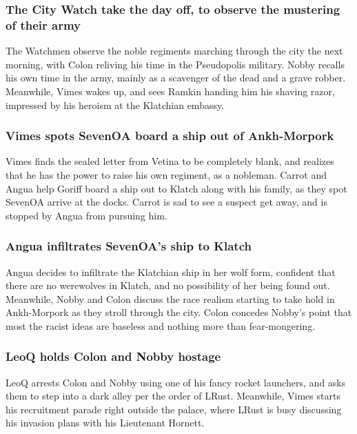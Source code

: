 \subsubsection{The City Watch take the day off, to observe the mustering of their army}
The Watchmen observe the noble regiments marching through the city the next morning, with
\Gls{Colon} reliving his time in the Pseudopolis military. \Gls{Nobby} recalls his own time in the
army, mainly as a scavenger of the dead and a grave robber. Meanwhile, \Gls{Vimes} wakes up, and
sees \Gls{Ramkin} handing him his shaving razor, impressed by his heroism at the Klatchian embassy.

\subsubsection{\Gls{Vimes} spots \Gls{SevenOA} board a ship out of Ankh-Morpork}
\Gls{Vimes} finds the sealed letter from \Gls{Vetina} to be completely blank, and realizes that he
has the power to raise his own regiment, as a nobleman. \Gls{Carrot} and \Gls{Angua} help
\Gls{Goriff} board a ship out to Klatch along with his family, as they spot \Gls{SevenOA} arrive at
the docks. \Gls{Carrot} is sad to see a suspect get away, and is stopped by \Gls{Angua} from
pursuing him.

\subsubsection{\Gls{Angua} infiltrates \Gls{SevenOA}'s ship to Klatch}
\Gls{Angua} decides to infiltrate the Klatchian ship in her wolf form, confident that there are no
werewolves in Klatch, and no possibility of her being found out. Meanwhile, \Gls{Nobby} and
\Gls{Colon} discuss the race realism starting to take hold in Ankh-Morpork as they stroll through
the city. \Gls{Colon} concedes \Gls{Nobby}'s point that most the racist ideas are baseless and
nothing more than fear-mongering.

\subsubsection{\Gls{LeoQ} holds \Gls{Colon} and \Gls{Nobby} hostage}
\Gls{LeoQ} arrests \Gls{Colon} and \Gls{Nobby} using one of his fancy rocket launchers, and asks
them to step into a dark alley per the order of \Gls{LRust}. Meanwhile, \Gls{Vimes} starts his
recruitment parade right outside the palace, where \Gls{LRust} is busy discussing his invasion plans
with his Lieutenant \Gls{Hornett}.


